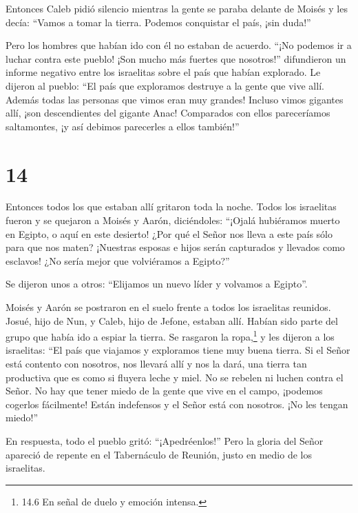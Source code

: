  Entonces Caleb pidió silencio mientras la gente se paraba
delante de Moisés y les decía: ``Vamos a tomar la tierra. Podemos
conquistar el país, ¡sin duda!''

 Pero los hombres que habían ido con él no estaban de
acuerdo. ``¡No podemos ir a luchar contra este pueblo! ¡Son mucho más
fuertes que nosotros!''  difundieron un informe negativo
entre los israelitas sobre el país que habían explorado. Le dijeron al
pueblo: ``El país que exploramos destruye a la gente que vive allí.
Además todas las personas que vimos eran muy grandes! 
Incluso vimos gigantes allí, ¡son descendientes del gigante Anac!
Comparados con ellos pareceríamos saltamontes, ¡y así debimos parecerles
a ellos también!''

\hypertarget{section-13}{%
\section{14}\label{section-13}}

 Entonces todos los que estaban allí gritaron toda la noche.
 Todos los israelitas fueron y se quejaron a Moisés y Aarón,
diciéndoles: ``¡Ojalá hubiéramos muerto en Egipto, o aquí en este
desierto!  ¿Por qué el Señor nos lleva a este país sólo para
que nos maten? ¡Nuestras esposas e hijos serán capturados y llevados
como esclavos! ¿No sería mejor que volviéramos a Egipto?''

 Se dijeron unos a otros: ``Elijamos un nuevo líder y
volvamos a Egipto''.

 Moisés y Aarón se postraron en el suelo frente a todos los
israelitas reunidos.  Josué, hijo de Nun, y Caleb, hijo de
Jefone, estaban allí. Habían sido parte del grupo que había ido a espiar
la tierra. Se rasgaron la ropa,\footnote{14.6 En señal de duelo y
  emoción intensa.}  y les dijeron a los israelitas: ``El
país que viajamos y exploramos tiene muy buena tierra.  Si
el Señor está contento con nosotros, nos llevará allí y nos la dará, una
tierra tan productiva que es como si fluyera leche y miel. 
No se rebelen ni luchen contra el Señor. No hay que tener miedo de la
gente que vive en el campo, ¡podemos cogerlos fácilmente! Están
indefensos y el Señor está con nosotros. ¡No les tengan miedo!''

 En respuesta, todo el pueblo gritó: ``¡Apedréenlos!'' Pero
la gloria del Señor apareció de repente en el Tabernáculo de Reunión,
justo en medio de los israelitas.

